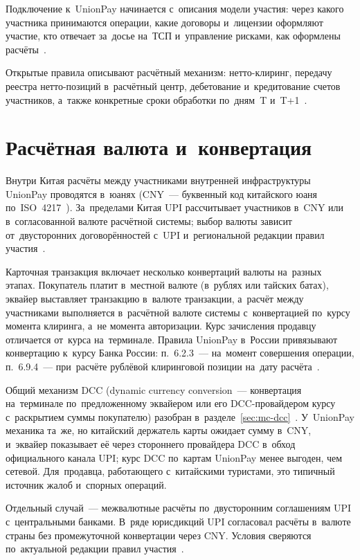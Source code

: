 Подключение к~UnionPay начинается с~описания модели участия: через какого
участника принимаются операции, какие договоры и~лицензии оформляют участие,
кто отвечает за~досье на~ТСП и~управление рисками, как оформлены
расчёты~\cite{unionpay-russia-rules}.

Открытые правила описывают расчётный механизм: нетто-клиринг, передачу реестра
нетто-позиций в~расчётный центр, дебетование и~кредитование счетов участников,
а~также конкретные сроки обработки по~дням~T
и~T+1~\cite{unionpay-russia-rules}.

\section{Расчётная валюта и~конвертация}\label{sec:up-currency}

Внутри Китая расчёты между участниками внутренней инфраструктуры UnionPay
проводятся в~юанях (CNY~--- буквенный код китайского юаня
по~ISO~4217~\cite{iso-4217}). За~пределами Китая UPI рассчитывает участников
в~CNY или в~согласованной валюте расчётной системы; выбор валюты зависит
от~двусторонних договорённостей с~UPI и~региональной редакции правил
участия~\cite{unionpay-russia-rules}.

Карточная транзакция включает несколько конвертаций валюты на~разных
этапах. Покупатель платит в~местной валюте (в~рублях или тайских батах),
эквайер выставляет транзакцию в~валюте транзакции, а~расчёт между участниками
выполняется в~расчётной валюте системы с~конвертацией по~курсу момента
клиринга, а~не момента авторизации. Курс зачисления продавцу отличается
от~курса на~терминале. Правила UnionPay в~России привязывают конвертацию
к~курсу Банка России: п.~6.2.3~--- на~момент совершения операции, п.~6.9.4~---
при~расчёте рублёвой клиринговой позиции на~дату
расчёта~\cite{unionpay-russia-rules}.

Общий механизм DCC (dynamic currency conversion~--- конвертация на~терминале
  по~предложенному эквайером или его DCC-провайдером курсу с~раскрытием суммы
покупателю) разобран в~разделе~\ref{sec:mc-dcc}~\cite{mc-dcc-guide}.
У~UnionPay механика та~же, но китайский держатель карты ожидает сумму в~CNY,
и~эквайер показывает её через стороннего провайдера DCC в~обход официального
канала UPI; курс DCC по~картам UnionPay менее выгоден, чем сетевой.
Для~продавца, работающего с~китайскими туристами, это типичный источник жалоб
и~спорных операций.

Отдельный случай~--- межвалютные расчёты по~двусторонним соглашениям
UPI с~центральными банками. В~ряде юрисдикций UPI согласовал расчёты
в~валюте страны без промежуточной конвертации через CNY. Условия сверяются
по~актуальной редакции правил участия~\cite{unionpay-russia-rules}.

